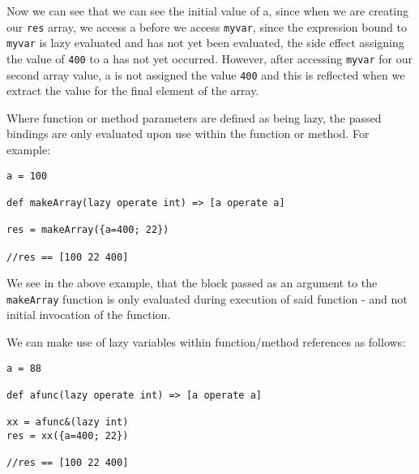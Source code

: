 \documentclass[conc-doc]{subfiles}
\begin{document}
Now we can see that we can see the initial value of a, since when we are creating our \lstinline{res} array, we access a before we access \lstinline{myvar}, since the expression bound to \lstinline{myvar} is lazy evaluated and has not yet been evaluated, the side effect assigning the value of \lstinline{400} to a has not yet occurred. However, after accessing \lstinline{myvar} for our second array value, a is not assigned the value \lstinline{400} and this is reflected when we extract the value for the final element of the array.

Where function or method parameters are defined as being lazy, the passed bindings are only evaluated upon use within the function or method. For example:
\begin{lstlisting}
a = 100

def makeArray(lazy operate int) => [a operate a]

res = makeArray({a=400; 22})

//res == [100 22 400]
\end{lstlisting}

We see in the above example, that the block passed as an argument to the \lstinline{makeArray} function is only evaluated during execution of said function - and not initial invocation of the function.

%
%
%


We can make use of lazy variables within function/method references as follows:

\begin{lstlisting}
a = 88

def afunc(lazy operate int) => [a operate a]

xx = afunc&(lazy int)
res = xx({a=400; 22})

//res == [100 22 400]
\end{lstlisting}
\end{document}
